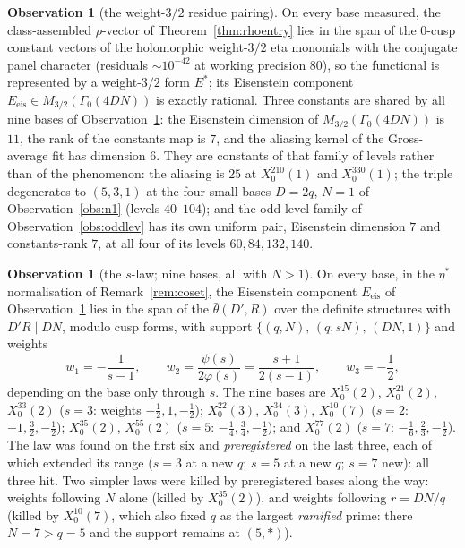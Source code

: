 \documentclass[11pt,reqno]{amsart}
\theoremstyle{plain}
\theoremstyle{definition}
\newtheorem{observation}[theorem]{Observation}
\begin{document}
\begin{observation}[the weight-$3/2$ residue pairing]\label{obs:eis32}
On every base measured, the class-assembled $\rho$-vector of
Theorem~\ref{thm:rhoentry} lies in the span of the $0$-cusp constant vectors of the
holomorphic weight-$3/2$ eta monomials with the conjugate panel character (residuals
$\sim10^{-42}$ at working precision $80$), so the functional is represented by a
weight-$3/2$ form $E^*$; its Eisenstein component $E_{\mathrm{eis}}\in
M_{3/2}(\Gamma_0(4DN))$ is exactly rational. Three constants are shared by all nine bases
of Observation~\ref{obs:slaw}: the Eisenstein dimension of $M_{3/2}(\Gamma_0(4DN))$ is
$11$, the rank of the constants map is $7$, and the aliasing kernel of the Gross-average
fit has dimension $6$. They are constants of that family of levels rather than of the
phenomenon: the aliasing is $25$ at $X_0^{210}(1)$ and $X_0^{330}(1)$; the triple
degenerates to $(5,3,1)$ at the four small bases $D=2q$, $N=1$ of
Observation~\ref{obs:n1} (levels $40$--$104$); and the odd-level family of
Observation~\ref{obs:oddlev} has its own uniform pair, Eisenstein dimension $7$ and
constants-rank $7$, at all four of its levels $60,84,132,140$.
\end{observation}

\begin{observation}[the $s$-law; nine bases, all with $N>1$]\label{obs:slaw}
On every base, in the $\eta^*$ normalisation of Remark~\ref{rem:coset}, the Eisenstein
component $E_{\mathrm{eis}}$ of Observation~\ref{obs:eis32} lies in the span of the $\bar\theta(D',R)$ over the
definite structures with $D'R\mid DN$, modulo cusp forms, with support
$\{(q,N),\,(q,sN),\,(DN,1)\}$ and weights
\[
  w_1=-\frac{1}{s-1},\qquad w_2=\frac{\psi(s)}{2\varphi(s)}=\frac{s+1}{2(s-1)},\qquad
  w_3=-\frac12 ,
\]
depending on the base only through $s$. The nine bases are $X_0^{15}(2)$, $X_0^{21}(2)$,
$X_0^{33}(2)$ ($s=3$: weights $-\tfrac12,1,-\tfrac12$); $X_0^{22}(3)$, $X_0^{34}(3)$,
$X_0^{10}(7)$ ($s=2$: $-1,\tfrac32,-\tfrac12$); $X_0^{35}(2)$, $X_0^{55}(2)$ ($s=5$:
$-\tfrac14,\tfrac34,-\tfrac12$); and $X_0^{77}(2)$ ($s=7$: $-\tfrac16,\tfrac23,-\tfrac12$).
The law was found on the first six and \emph{preregistered} on the last three, each of
which extended its range ($s=3$ at a new $q$; $s=5$ at a new $q$; $s=7$ new): all three
hit. Two simpler laws were killed by preregistered bases along the way: weights following
$N$ alone (killed by $X_0^{35}(2)$), and weights following $r=DN/q$ (killed by
$X_0^{10}(7)$, which also fixed $q$ as the largest \emph{ramified} prime: there $N=7>q=5$
and the support remains at $(5,\ast)$).
\end{observation}
\end{document}
